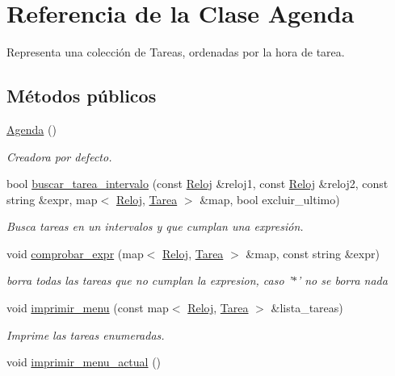 \hypertarget{class_agenda}{\section{Referencia de la Clase Agenda}
\label{class_agenda}
}


Representa una colección de Tareas, ordenadas por la hora de tarea.  


\subsection*{Métodos públicos}
\begin{DoxyCompactItemize}
\item 
\hyperlink{class_agenda_a6685054d2b4ccbf2a4ef2ac5e3746bc3}{Agenda} ()
\begin{DoxyCompactList}\small\item\em Creadora por defecto. \end{DoxyCompactList}\item 
bool \hyperlink{class_agenda_a33563a51900832ac1daeeb3813d00fdc}{buscar\-\_\-tarea\-\_\-intervalo} (const \hyperlink{class_reloj}{Reloj} \&reloj1, const \hyperlink{class_reloj}{Reloj} \&reloj2, const string \&expr, map$<$ \hyperlink{class_reloj}{Reloj}, \hyperlink{class_tarea}{Tarea} $>$ \&map, bool excluir\-\_\-ultimo)
\begin{DoxyCompactList}\small\item\em Busca tareas en un intervalos y que cumplan una expresión. \end{DoxyCompactList}\item 
void \hyperlink{class_agenda_a02f25e376fa69a673fd4bf9349a033e1}{comprobar\-\_\-expr} (map$<$ \hyperlink{class_reloj}{Reloj}, \hyperlink{class_tarea}{Tarea} $>$ \&map, const string \&expr)
\begin{DoxyCompactList}\small\item\em borra todas las tareas que no cumplan la expresion, caso '$\ast$' no se borra nada \end{DoxyCompactList}\item 
void \hyperlink{class_agenda_a755177707be90968dedb6ff36647c3af}{imprimir\-\_\-menu} (const map$<$ \hyperlink{class_reloj}{Reloj}, \hyperlink{class_tarea}{Tarea} $>$ \&lista\-\_\-tareas)
\begin{DoxyCompactList}\small\item\em Imprime las tareas enumeradas. \end{DoxyCompactList}\item 
void \hyperlink{class_agenda_add9c46e874c521513328bee5c7fb7fee}{imprimir\-\_\-menu\-\_\-actual} ()

\end{DoxyCompactItemize}
